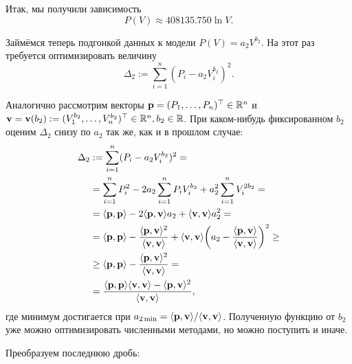 Итак, мы получили зависимость 
\begin{equation} \label{eq:eq3}
P(V) \approx 408135.750 \ln V.
\end{equation}

Займёмся теперь подгонкой данных к модели $P(V)=a_2 V ^{b_2}$. На этот раз требуется оптимизировать величину
\[
\Delta _2 := \sum \limits_{i=1}^n (P_i - a_2 V_i ^{b_2})^2.
\]

Аналогично рассмотрим векторы $\mathbf{p} = (P_1, \ldots, P_n)^\top \in \mathbb{R}^n$ и $\mathbf{v} = \mathbf{v}(b_2) := (V_1^{b_2}, \ldots,\\ V_n^{b_2})^\top \in \mathbb{R}^n, b_2 \in \mathbb{R}$. При каком-нибудь фиксированном $b_2$ оценим $\Delta _2$ снизу по $a_2$ так же, как и в прошлом случае:
\[
\begin{split}
\Delta _2 & := \sum \limits_{i=1}^n (P_i - a_2 V_i ^{b_2})^2 =\\
& = \sum \limits_{i=1}^n P_i^2 - 2a_2 \sum \limits_{i=1}^n P_i V_i^{b_2} + a_2^2 \sum \limits_{i=1}^n V_i^{2 b_2} =\\
& = \langle \mathbf{p}, \mathbf{p} \rangle - 2 \langle \mathbf{p}, \mathbf{v} \rangle a_2 + \langle \mathbf{v}, \mathbf{v} \rangle a_2^2 = \\
& = \langle \mathbf{p}, \mathbf{p} \rangle - \dfrac{\langle \mathbf{p}, \mathbf{v} \rangle^2}{\langle \mathbf{v}, \mathbf{v} \rangle} +
\langle \mathbf{v}, \mathbf{v} \rangle \bigg(  a_2 - \dfrac{\langle \mathbf{p}, \mathbf{v} \rangle}{\langle \mathbf{v}, \mathbf{v} \rangle} \bigg) ^2 \ge \\
& \ge \langle \mathbf{p}, \mathbf{p} \rangle - \dfrac{\langle \mathbf{p}, \mathbf{v} \rangle^2}{\langle \mathbf{v}, \mathbf{v} \rangle} =\\
& = \dfrac{\langle \mathbf{p}, \mathbf{p} \rangle\langle \mathbf{v}, \mathbf{v} \rangle - \langle \mathbf{p}, \mathbf{v} \rangle^2}{\langle \mathbf{v}, \mathbf{v} \rangle},
\end{split}
\]
где минимум достигается при $a_{2 \min}=\langle \mathbf{p}, \mathbf{v} \rangle / \langle \mathbf{v}, \mathbf{v} \rangle$. Полученную функцию от $b_2$ уже можно оптимизировать численными методами, но можно поступить и иначе.\par
Преобразуем последнюю дробь:
